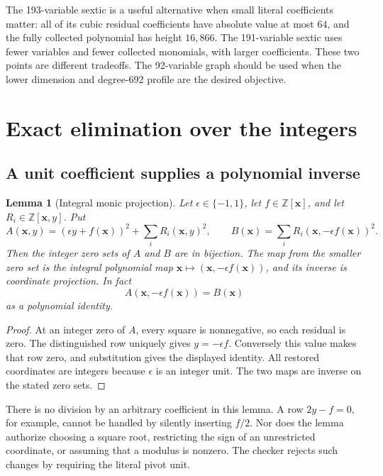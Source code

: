 \documentclass[11pt]{article}
\newtheorem{lemma}[theorem]{Lemma}
\newcommand{\Z}{\mathbb Z}
\begin{document}
The 193-variable sextic is a useful alternative when small literal
coefficients matter: all of its cubic residual coefficients have
absolute value at most $64$, and the fully collected polynomial has
height $16,866$. The 191-variable sextic uses fewer variables and fewer
collected monomials, with larger coefficients. These two points are
different tradeoffs. The 92-variable graph should be used when the
lower dimension and degree-692 profile are the desired objective.

\section{Exact elimination over the integers}\label{sec:elimination}

\subsection{A unit coefficient supplies a polynomial inverse}

\begin{lemma}[Integral monic projection]\label{lem:projection}
Let $\epsilon\in\{-1,1\}$, let $f\in\Z[\boldsymbol x]$, and let
$R_i\in\Z[\boldsymbol x,y]$. Put
\[
 A(\boldsymbol x,y)=(\epsilon y+f(\boldsymbol x))^2+
                    \sum_iR_i(\boldsymbol x,y)^2,
\qquad
 B(\boldsymbol x)=\sum_iR_i(\boldsymbol x,-\epsilon f(\boldsymbol x))^2.
\]
Then the integer zero sets of $A$ and $B$ are in bijection. The map from
the smaller zero set is the integral polynomial map
$\boldsymbol x\mapsto(\boldsymbol x,-\epsilon f(\boldsymbol x))$,
and its inverse is coordinate projection. In fact
\[
 A(\boldsymbol x,-\epsilon f(\boldsymbol x))=B(\boldsymbol x)
\]
as a polynomial identity.
\end{lemma}
\begin{proof}
At an integer zero of $A$, every square is nonnegative, so each residual
is zero. The distinguished row uniquely gives $y=-\epsilon f$.
Conversely this value makes that row zero, and substitution gives the
displayed identity. All restored coordinates are integers because
$\epsilon$ is an integer unit. The two maps are inverse on the stated
zero sets.
\end{proof}

There is no division by an arbitrary coefficient in this lemma. A row
$2y-f=0$, for example, cannot be handled by silently inserting $f/2$.
Nor does the lemma authorize choosing a square root, restricting the
sign of an unrestricted coordinate, or assuming that a modulus is nonzero.
The checker rejects such changes by requiring the literal pivot unit.
\end{document}
